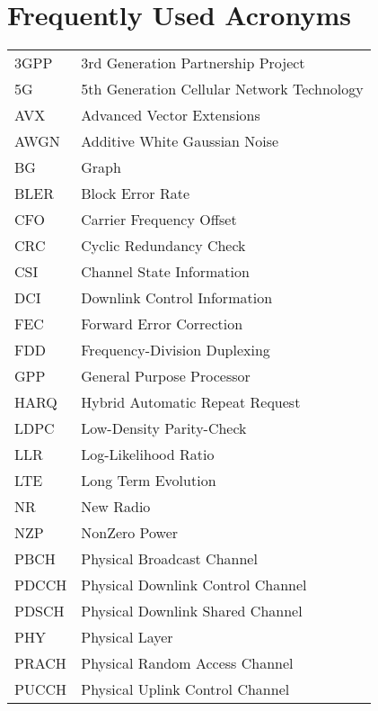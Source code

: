 \chapter{Frequently Used Acronyms}
\hypertarget{acronyms}{}\label{acronyms}
\tabulinesep=1mm
\begin{longtabu}spread 0pt [c]{*{2}{|X[-1]}|}
\hline
3GPP  &3rd Generation Partnership Project   \\
5G  &5th Generation Cellular Network Technology   \\
AVX  &Advanced Vector Extensions   \\
AWGN  &Additive White Gaussian Noise   \\
BG  & Graph   \\
BLER  &Block Error Rate   \\
CFO  &Carrier Frequency Offset   \\
CRC  &Cyclic Redundancy Check   \\
CSI  &Channel State Information   \\
DCI  &Downlink Control Information   \\
FEC  &Forward Error Correction   \\
FDD  &Frequency-\/\+Division Duplexing   \\
GPP  &General Purpose Processor   \\
HARQ  &Hybrid Automatic Repeat Request   \\
LDPC  &Low-\/\+Density Parity-\/\+Check   \\
LLR  &Log-\/\+Likelihood Ratio   \\
LTE  &Long Term Evolution   \\
NR  &New Radio   \\
NZP  &Non\+Zero Power   \\
PBCH  &Physical Broadcast Channel   \\
PDCCH  &Physical Downlink Control Channel   \\
PDSCH  &Physical Downlink Shared Channel   \\
PHY  &Physical Layer   \\
PRACH  &Physical Random Access Channel   \\
PUCCH  &Physical Uplink Control Channel   \\

\end{longtabu}
